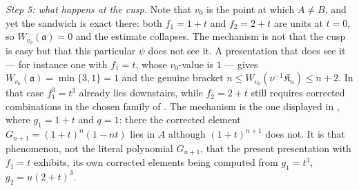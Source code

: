 \begin{example}
\emph{Step 5: what happens at the cusp.}  Note that $v_0$ is the point at
which $A\ne B$, and yet the sandwich is exact there: both $f_1=1+t$ and
$f_2=2+t$ are units at $t=0$, so $W_{v_0}(\mathfrak a)=0$ and the
estimate collapses.  The mechanism is not that the cusp is easy but that
this particular $\psi$ does not see it.  A presentation that does see it
--- for instance one with $f_1=t$, whose $v_0$-value is $1$ --- gives
$W_{v_0}(\mathfrak a)=\min\{3,1\}=1$ and the genuine bracket
$n\le W_{v_0}(\nu^{-1}\mathfrak K_n)\le n+2$.  In that case $f_1^3=t^3$ already lies downstairs, while
$f_2=2+t$ still requires corrected combinations in the chosen family of
.  The mechanism is the one displayed
in , where $g_1=1+t$ and $q=1$: there the
corrected element $G_{n+1}=(1+t)^n(1-nt)$ lies in $A$ although
$(1+t)^{n+1}$ does not.  It is that phenomenon, not the literal
polynomial $G_{n+1}$, that the present presentation with $f_1=t$
exhibits, its own corrected elements being computed from
$g_1=t^3$, $g_2=u(2+t)^3$.
\end{example}


